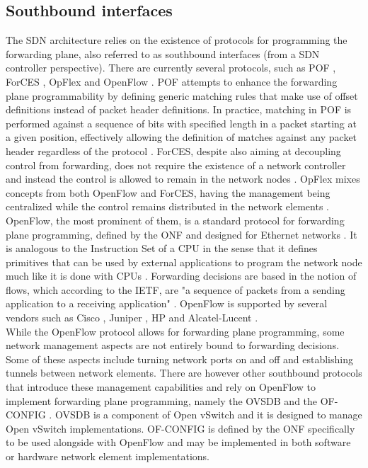 \subsection{Southbound interfaces}
\label{subsection:sdn-southbound-interfaces}
The \gls{SDN} architecture relies on the existence of protocols for programming the forwarding plane, also referred to as southbound interfaces (from a \gls{SDN} controller perspective).
There are currently several protocols, such as \gls{POF} \cite{POF}, \gls{ForCES} \cite{ForCES}, OpFlex \cite{OpFlex} and OpenFlow \cite{OFWP}.
%
\gls{POF} attempts to enhance the forwarding plane programmability by defining generic matching rules that make use of offset definitions instead of packet header definitions.
In practice, matching in \gls{POF} is performed against a sequence of bits with specified length in a packet starting at a given position, effectively allowing the definition of matches against any packet header regardless of the protocol \cite{POF}.
%
\gls{ForCES}, despite also aiming at decoupling control from forwarding, does not require the existence of a network controller and instead the control is allowed to remain in the network nodes \cite{Kreutz2014}.
%
OpFlex mixes concepts from both OpenFlow and \gls{ForCES}, having the management being centralized while the control remains distributed in the network elements \cite{Duffy2014}.\\
%
OpenFlow, the most prominent of them, is a standard protocol for forwarding plane programming, defined by the \gls{ONF} and designed for Ethernet networks \cite{OFWP}.
It is analogous to the Instruction Set of a \gls{CPU} in the sense that it defines primitives that can be used by external applications to program the network node much like it is done with \glspl{CPU} \cite{OFWP}.
Forwarding decisions are based in the notion of flows, which according to the \gls{IETF}, are "a sequence of packets from a sending application to a receiving application" \cite{IETFFLOW}.
OpenFlow is supported by several vendors such as Cisco \cite{CISCOOF}, Juniper \cite{JUNOSOF}, HP \cite{HPVAN} and Alcatel-Lucent \cite{ALUOF}.\\
%
While the OpenFlow protocol allows for forwarding plane programming, some network management aspects are not entirely bound to forwarding decisions.
Some of these aspects include turning network ports on and off and establishing tunnels between network elements.
There are however other southbound protocols that introduce these management capabilities and rely on OpenFlow to implement forwarding plane programming, namely the \gls{OVSDB} and the \gls{OF-CONFIG} \cite{OVSDBvsOFCONFIG}.
\gls{OVSDB} is a component of Open vSwitch and it is designed to manage Open vSwitch implementations.
\gls{OF-CONFIG} is defined by the \gls{ONF} specifically to be used alongside with OpenFlow and may be implemented in both software or hardware network element implementations.
%
%
